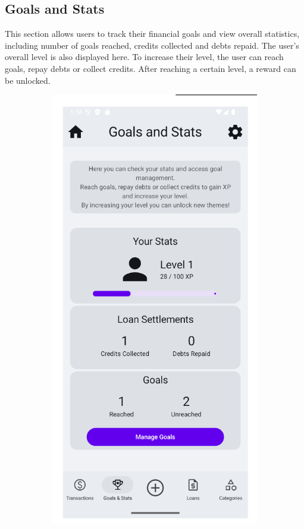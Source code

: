 \documentclass[a4paper,12pt]{article}
\begin{document}
\subsection{Goals and Stats}
This section allows users to track their financial goals and view overall statistics, including number of goals reached, credits collected and debts repaid. The user's overall level is also displayed here. To increase their level, the user can reach goals, repay debts or collect credits. After reaching a certain level, a reward can be unlocked.

\begin{figure}[H]
    \centering
    \begin{subfigure}[b]{0.23\textwidth}
        \includegraphics[width=\textwidth]{goals_stats.png}

\end{subfigure}
\end{figure}
\end{document}
